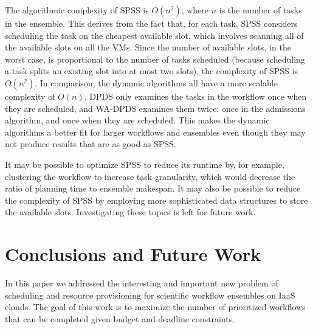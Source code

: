 \documentclass[conference]{IEEEtran}
\begin{document}
The algorithmic complexity of SPSS is $O(n^2)$, where $n$ is the number of tasks in the ensemble. This derives from the fact that, for each task, SPSS considers scheduling the task on the cheapest available slot, which involves scanning all of the available slots on all the VMs. Since the number of available slots, in the worst case, is proportional to the number of tasks scheduled (because scheduling a task splits an existing slot into at most two slots), the complexity of SPSS is $O(n^2)$. In comparison, the dynamic algorithms all have a more scalable complexity of $O(n)$. DPDS only examines the tasks in the workflow once when they are scheduled, and WA-DPDS examines them twice: once in the admissions algorithm, and once when they are scheduled. This makes the dynamic algorithms a better fit for larger workflows and ensembles even though they may not produce results that are as good as SPSS.

It may be possible to optimize SPSS to reduce its runtime by, for example, clustering the workflow to increase task granularity, which would decrease the ratio of planning time to ensemble makespan. It may also be possible to reduce the complexity of SPSS by employing more sophisticated data structures to store the available slots. Investigating these topics is left for future work.


\section{Conclusions and Future Work}
\label{sec:conclusions}

In this paper we addressed the interesting and important new problem of scheduling and resource provisioning for scientific workflow ensembles on IaaS clouds. The goal of this work is to maximize the number of prioritized workflows that can be completed given budget and deadline constraints.


\end{document}
